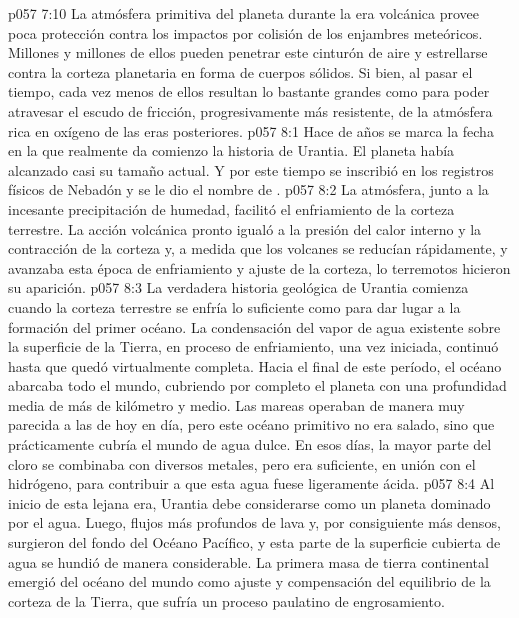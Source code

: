 \vs p057 7:10 La atmósfera primitiva del planeta durante la era volcánica provee poca protección contra los impactos por colisión de los enjambres meteóricos. Millones y millones de ellos pueden penetrar este cinturón de aire y estrellarse contra la corteza planetaria en forma de cuerpos sólidos. Si bien, al pasar el tiempo, cada vez menos de ellos resultan lo bastante grandes como para poder atravesar el escudo de fricción, progresivamente más resistente, de la atmósfera rica en oxígeno de las eras posteriores.
\vs p057 8:1 Hace  de años se marca la fecha en la que realmente da comienzo la historia de Urantia. El planeta había alcanzado casi su tamaño actual. Y por este tiempo se inscribió en los registros físicos de Nebadón y se le dio el nombre de .
\vs p057 8:2 La atmósfera, junto a la incesante precipitación de humedad, facilitó el enfriamiento de la corteza terrestre. La acción volcánica pronto igualó a la presión del calor interno y la contracción de la corteza y, a medida que los volcanes se reducían rápidamente, y avanzaba esta época de enfriamiento y ajuste de la corteza, lo terremotos hicieron su aparición.
\vs p057 8:3 La verdadera historia geológica de Urantia comienza cuando la corteza terrestre se enfría lo suficiente como para dar lugar a la formación del primer océano. La condensación del vapor de agua existente sobre la superficie de la Tierra, en proceso de enfriamiento, una vez iniciada, continuó hasta que quedó virtualmente completa. Hacia el final de este período, el océano abarcaba todo el mundo, cubriendo por completo el planeta con una profundidad media de más de kilómetro y medio. Las mareas operaban de manera muy parecida a las de hoy en día, pero este océano primitivo no era salado, sino que prácticamente cubría el mundo de agua dulce. En esos días, la mayor parte del cloro se combinaba con diversos metales, pero era suficiente, en unión con el hidrógeno, para contribuir a que esta agua fuese ligeramente ácida.
\vs p057 8:4 Al inicio de esta lejana era, Urantia debe considerarse como un planeta dominado por el agua. Luego, flujos más profundos de lava y, por consiguiente más densos, surgieron del fondo del Océano Pacífico, y esta parte de la superficie cubierta de agua se hundió de manera considerable. La primera masa de tierra continental emergió del océano del mundo como ajuste y compensación del equilibrio de la corteza de la Tierra, que sufría un proceso paulatino de engrosamiento.

